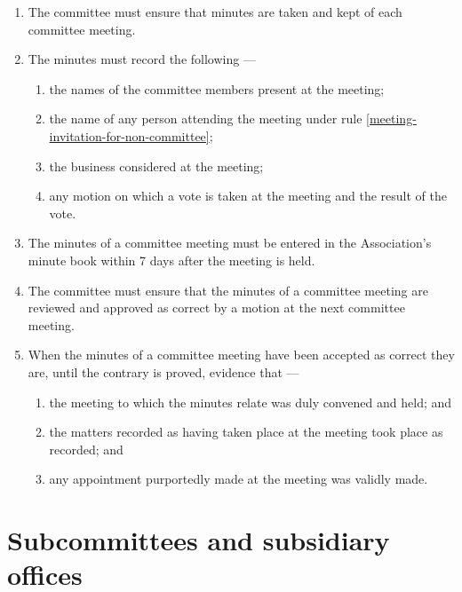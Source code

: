 \documentclass[../constitution.tex]{subfiles}
\begin{document}
\begin{enumerate}

\item The committee must ensure that minutes are taken and kept of each committee meeting.
\item The minutes must record the following ---

  \begin{enumerate}
  
  \item the names of the committee members present at the meeting;
  \item the name of any person attending the meeting under rule \ref{meeting-invitation-for-non-committee};
  \item the business considered at the meeting;
  \item any motion on which a vote is taken at the meeting and the result of the vote.
  \end{enumerate}
\item The minutes of a committee meeting must be entered in the Association's minute book within 7 days after the meeting is held.
\item The committee must ensure that the minutes of a committee meeting are reviewed and approved as correct by a motion at the next committee meeting. 
\item When the minutes of a committee meeting have been accepted as correct they are, until the contrary is proved, evidence that ---

  \begin{enumerate}
  
  \item the meeting to which the minutes relate was duly convened and held; and
  \item the matters recorded as having taken place at the meeting took place as recorded; and
  \item any appointment purportedly made at the meeting was validly made.
  \end{enumerate}
\end{enumerate}


\hypertarget{division-5-subcommittees-and-subsidiary-offices}{%
\section{Subcommittees and subsidiary offices}\label{division-5-subcommittees-and-subsidiary-offices}}
\end{document}
